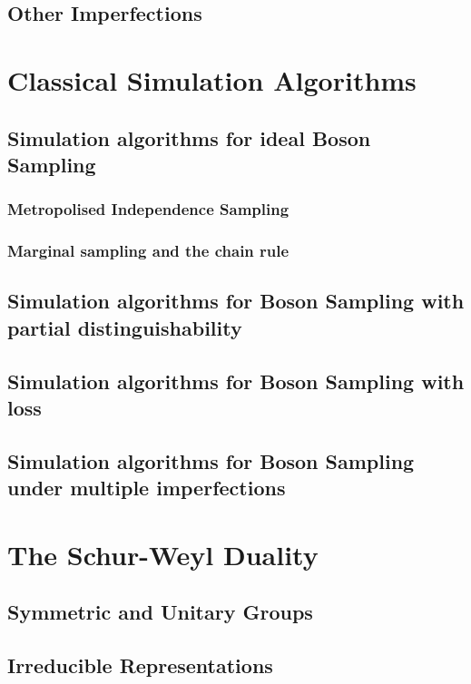 \subsection{Other Imperfections}

\section{Classical Simulation Algorithms}

\subsection{Simulation algorithms for ideal Boson Sampling}

\subsubsection{Metropolised Independence Sampling}

\subsubsection{Marginal sampling and the chain rule}

\subsection{Simulation algorithms for Boson Sampling with partial distinguishability}

\subsection{Simulation algorithms for Boson Sampling with loss}

\subsection{Simulation algorithms for Boson Sampling under multiple imperfections}

\section{The Schur-Weyl Duality}

\subsection{Symmetric and Unitary Groups}

\subsection{Irreducible Representations}

